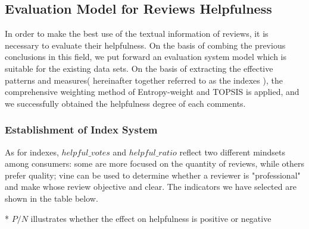 \documentclass{mcmthesis}
\begin{document}
\subsection{Evaluation Model for Reviews Helpfulness}
\quad \quad In order to make the best use of the textual information of reviews, it is necessary to evaluate their helpfulness. On the basis of combing the previous conclusions in this field, we put forward an evaluation system model which is suitable for the existing data sets. On the basis of extracting the effective patterns and measures( hereinafter together referred to as the indexes ), the comprehensive weighting method of Entropy-weight and TOPSIS is applied, and we successfully obtained the helpfulness degree of each comments.

\subsubsection{Establishment of Index System}
\quad \quad As for indexes, $helpful\_votes$ and $helpful\_ratio$ reflect two different mindsets among consumers: some are more focused on the quantity of reviews, while others prefer quality; vine can be used to determine whether a reviewer is "professional" and make whose review objective and clear. The indicators we have selected are shown in the table below.
\begin{table}[H]
    \centering
    \caption{Indexes for Review Helpfulness Evaluation}
    \begin{threeparttable}
    \begin{tablenotes}
    \footnotesize
    \item[*] $P/N$ illustrates whether the effect on helpfulness is positive or negative
    \end{tablenotes}
    \end{threeparttable}
\end{table}
\end{document}
